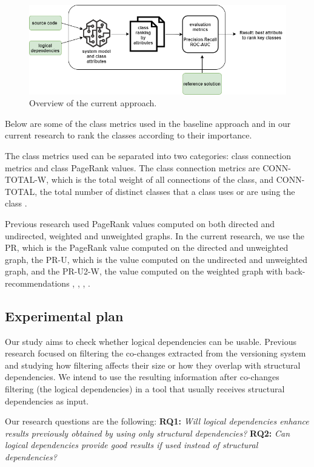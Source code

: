 \documentclass[runningheads]{comsis2}
\begin{document}
\begin{figure}
\centering
\includegraphics[width=\textwidth]{current_approach.PNG}
\caption{Overview of the current approach.}
\label{fig:baseline_approach}
\centering
\end{figure}
Below are some of the class metrics used in the baseline approach and in our current research to rank the classes according to their importance. 

The class metrics used can be separated into two categories: class connection metrics and class PageRank values.
The class connection metrics are CONN-TOTAL-W, which is the total weight of all connections of the class, and CONN-TOTAL, the total number of distinct classes that a class uses or are using the class \cite{Finding-key-classes}.

Previous research used PageRank values computed on both directed and undirected, weighted and unweighted graphs. In the current research, we use the PR, which is the PageRank value computed on the directed and unweighted graph, the PR-U, which is the value computed on the undirected and unweighted graph, and the PR-U2-W, the value computed on the weighted graph with back-recommendations \cite{PagerankENASE}, \cite{enase15}, \cite{Finding-key-classes}, \cite{PagerankSACI}.


\subsection{Experimental plan}
\label{sec:plan}

Our study aims to check whether logical dependencies can be usable. Previous research focused on filtering the co-changes extracted from the versioning system and studying how filtering affects their size or how they overlap with structural dependencies. We intend to use the resulting information after co-changes filtering (the logical dependencies) in a tool that usually receives structural dependencies as input.

Our research questions are the following: \textbf{RQ1:} \textit{Will logical dependencies enhance results previously obtained by using only structural dependencies?} \textbf{RQ2:} \textit{Can logical dependencies provide good results if used instead of structural dependencies?}
\end{document}
